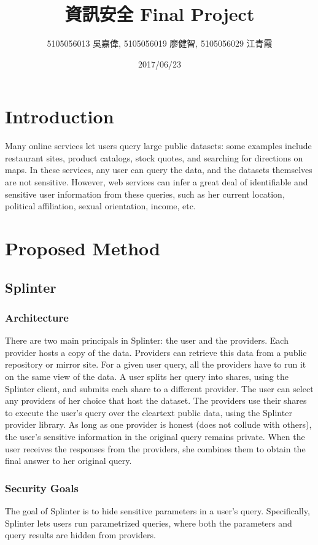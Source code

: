 \documentclass[12pt,a4paper]{article}
\title{\huge 資訊安全 Final Project} %
\author{5105056013 吳嘉偉, 5105056019 廖健智, 5105056029 江青霞} %
\date{2017/06/23} %
\begin{document}
\clearpage
\maketitle %

\begin{multicols}{2}

\section{Introduction}
Many online services let users query large public 
datasets: some examples include restaurant sites, 
product catalogs, stock quotes, and searching for 
directions on maps. In these services, any user can 
query the data, and the datasets themselves are not 
sensitive. However, web services can infer a great 
deal of identifiable and sensitive user information 
from these queries, such as her current location, 
political affiliation, sexual orientation, income, 
etc.
		
\section{Proposed Method}
\subsection{Splinter}
\subsubsection{Architecture}
There are two main principals in Splinter: the user 
and the providers. Each provider hosts a copy of 
the data. Providers can retrieve this data from a 
public repository or mirror site. For a given user 
query, all the providers have to run it on the same 
view of the data. 
  A user splits her query into shares, using the 
Splinter client, and submits each share to a 
different provider. The user can select any 
providers of her choice that host the dataset. The 
providers use their shares to execute the user’s 
query over the cleartext public data, using the 
Splinter provider library. As long as one provider 
is honest (does not collude with others), the 
user’s sensitive information in the original query 
remains private. When the user receives the 
responses from the providers, she combines them to 
obtain the final answer to her original query.

\subsubsection{Security Goals}
The goal of Splinter is to hide sensitive 
parameters in a user's query. Specifically, 
Splinter lets users run parametrized queries, where 
both the parameters and query results are hidden 
from providers.


\end{multicols}
\end{document}

